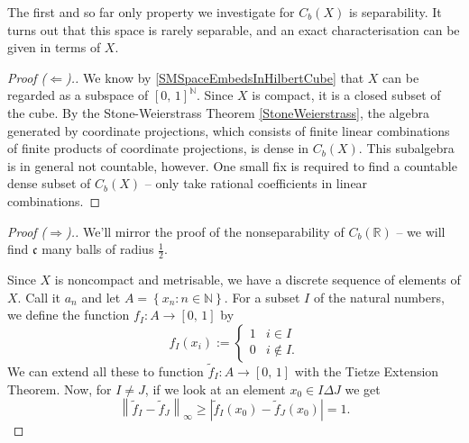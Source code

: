 The first and so far only property we investigate for \( C_b(X) \) is separability. It turns out that this space is rarely separable, and an exact characterisation can be given in terms of \( X \).


\begin{proof}[Proof (\(\Leftarrow\)).]
    We know by \ref{SMSpaceEmbedsInHilbertCube} that \( X \) can be regarded as a subspace of \( [0,\,1]^{ \mathbb{N} } \). Since \( X \) is compact, it is a closed subset of the cube. By the Stone-Weierstrass Theorem \ref{StoneWeierstrass}, the algebra generated by coordinate projections, which consists of finite linear combinations of finite products of coordinate projections, is dense in \( C_b(X). \)
    This subalgebra is in general not countable, however. One small fix is required to find a countable dense subset of \( C_b(X) \) -- only take rational coefficients in linear combinations.
\end{proof}

\begin{proof}[Proof (\(\Rightarrow\)).]

We'll mirror the proof of the nonseparability of \( C_b( \mathbb{R} ) \) -- we will find \( \mathfrak{c} \) many balls of radius \( \frac{1}{2} \).

Since \( X \) is noncompact and metrisable, we have a discrete sequence of elements of \( X \). Call it \( a_n \) and let \( A = \left\{ x_n : n \in \mathbb{N} \right\} \). For a subset \( I  \) of the natural numbers, we define the function \( f_I: A \to [0,\,1] \) by
\[ 
    f_I (x_i) := \begin{cases}
        1 &i \in I \\
        0 &i \not\in I.
    \end{cases}
\]
We can extend all these to function \( \widetilde{f}_I: A \to [0,\,1] \) with the Tietze Extension Theorem. %
Now, for \( I \neq J \), if we look at an element \( x_0 \in I \Delta J\) we get
\[ 
    \left \| \widetilde{f}_I - \widetilde{f}_J \right\|_\infty \geqslant \left| \widetilde{f}_I(x_0) - \widetilde{f}_J(x_0) \right| = 1. 
\]
\end{proof}

